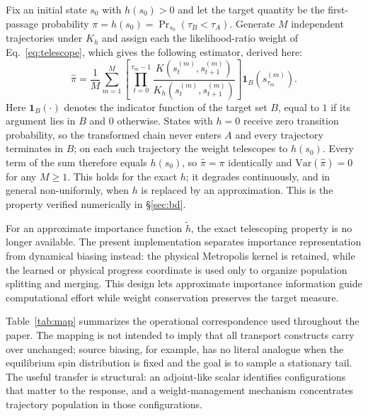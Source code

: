 \documentclass[a4paper,fleqn]{cas-sc}
\begin{document}
Fix an initial state $s_0$ with $h(s_0)>0$ and let the target quantity be the first-passage
probability $\pi=h(s_0)=\Pr_{s_0}(\tau_B<\tau_A)$. Generate $M$ independent trajectories under
$K_h$ and assign each the likelihood-ratio weight of Eq.~\eqref{eq:telescope}, which gives
the following estimator, derived here:
\begin{equation}
\hat\pi=\frac1M\sum_{m=1}^{M}
\left[\prod_{t=0}^{\tau_m-1}\frac{K(s_t^{(m)},s_{t+1}^{(m)})}{K_h(s_t^{(m)},s_{t+1}^{(m)})}\right]
\mathbf 1_B\!\left(s_{\tau_m}^{(m)}\right).
\label{eq:zvest}
\end{equation}
Here $\mathbf 1_B(\cdot)$ denotes the indicator function of the target set $B$, equal to $1$ if
its argument lies in $B$ and $0$ otherwise.
States with $h=0$ receive zero transition probability, so the transformed chain never enters
$A$ and every trajectory terminates in $B$; on each such trajectory the weight telescopes to
$h(s_0)$. Every term of the sum therefore equals $h(s_0)$, so $\hat\pi=\pi$ identically and
$\mathrm{Var}(\hat\pi)=0$ for any $M\ge1$. This holds for the exact $h$; it degrades
continuously, and in general non-uniformly, when $h$ is replaced by an approximation. This is
the property verified numerically in \S\ref{sec:bd}.

For an approximate importance function $\tilde h$, the exact telescoping property is no
longer available. The present implementation separates importance representation from
dynamical biasing instead: the physical Metropolis kernel is retained, while the learned or
physical progress coordinate is used only to organize population splitting and merging. This
design lets approximate importance information guide computational effort while weight
conservation preserves the target measure.

Table~\ref{tab:map} summarizes the operational correspondence used throughout the paper. The
mapping is not intended to imply that all transport constructs carry over unchanged; source
biasing, for example, has no literal analogue when the equilibrium spin distribution is fixed
and the goal is to sample a stationary tail. The useful transfer is structural: an
adjoint-like scalar identifies configurations that matter to the response, and a
weight-management mechanism concentrates trajectory population in those configurations.
\end{document}
